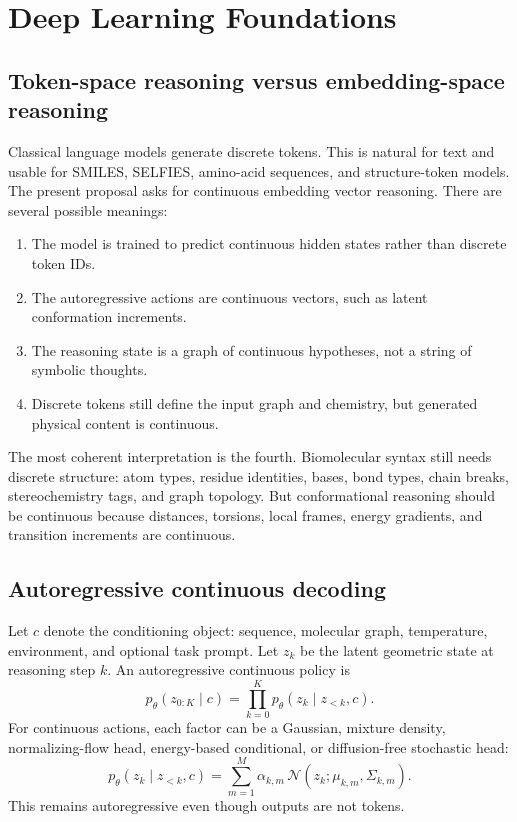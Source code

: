 \documentclass[11pt]{article}
\begin{document}
\section{Deep Learning Foundations}

\subsection{Token-space reasoning versus embedding-space reasoning}

Classical language models generate discrete tokens. This is natural for text and usable for SMILES, SELFIES, amino-acid sequences, and structure-token models. The present proposal asks for continuous embedding vector reasoning. There are several possible meanings:

\begin{enumerate}[leftmargin=2em]
  \item The model is trained to predict continuous hidden states rather than discrete token IDs.
  \item The autoregressive actions are continuous vectors, such as latent conformation increments.
  \item The reasoning state is a graph of continuous hypotheses, not a string of symbolic thoughts.
  \item Discrete tokens still define the input graph and chemistry, but generated physical content is continuous.
\end{enumerate}

The most coherent interpretation is the fourth. Biomolecular syntax still needs discrete structure: atom types, residue identities, bases, bond types, chain breaks, stereochemistry tags, and graph topology. But conformational reasoning should be continuous because distances, torsions, local frames, energy gradients, and transition increments are continuous.

\subsection{Autoregressive continuous decoding}

Let $c$ denote the conditioning object: sequence, molecular graph, temperature, environment, and optional task prompt. Let $z_k$ be the latent geometric state at reasoning step $k$. An autoregressive continuous policy is
\[
p_\theta(z_{0:K}\mid c)=\prod_{k=0}^K p_\theta(z_k\mid z_{<k},c).
\]
For continuous actions, each factor can be a Gaussian, mixture density, normalizing-flow head, energy-based conditional, or diffusion-free stochastic head:
\[
p_\theta(z_k\mid z_{<k},c)
=\sum_{m=1}^{M}\alpha_{k,m}\,
\mathcal{N}(z_k;\mu_{k,m},\Sigma_{k,m}).
\]
This remains autoregressive even though outputs are not tokens.
\end{document}
